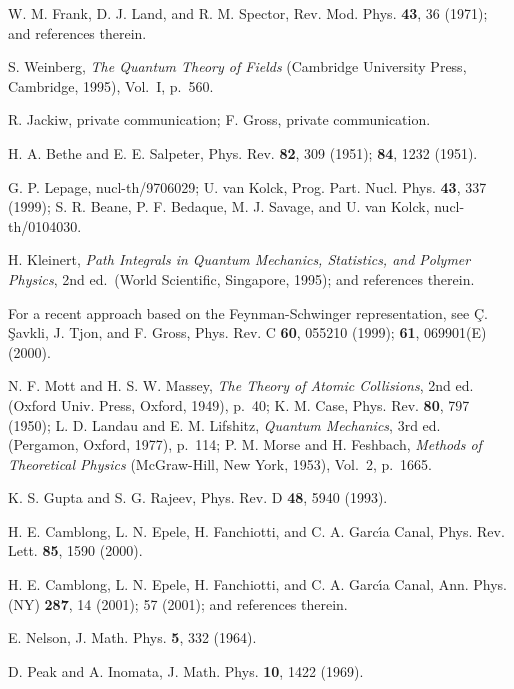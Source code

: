 \documentclass[a4paper,preprint,draft,showpacs,amsmath,amsfonts,amssymb,aps,prd]{revtex4}%
\begin{document}
\begin{thebibliography}{99}

W. M. Frank, D. J. Land, and R. M. Spector,
Rev. Mod. Phys. {\bf 43}, 36 (1971); and references therein.

S. Weinberg,
 {\em The Quantum Theory of Fields\/}
(Cambridge University Press, Cambridge, 1995), Vol.\ I, p.\ 560. 

R. Jackiw, private communication;
F. Gross, private communication.

H. A. Bethe and E. E. Salpeter,
Phys. Rev. {\bf 82},  309 (1951);
{\bf 84},  1232 (1951).

G. P. Lepage, nucl-th/9706029;
U. van Kolck, Prog. Part. Nucl. Phys. {\bf 43}, 337 (1999);
S. R. Beane, P. F. Bedaque, M. J. Savage, and U. van Kolck,
nucl-th/0104030.

H. Kleinert, {\em Path Integrals in Quantum Mechanics, Statistics,
and Polymer Physics\/}, 2nd ed.\  
(World Scientific, Singapore, 1995);
and references therein.

For a recent approach based
on the Feynman-Schwinger representation, see
\c{C}. \c{S}avkli, J. Tjon, and F. Gross,
Phys. Rev. C {\bf 60}, 055210 (1999); {\bf 61}, 069901(E) (2000).

N. F. Mott and H. S. W. Massey,
{\em The Theory of Atomic Collisions\/},
2nd ed. (Oxford Univ. Press, Oxford, 1949),
p.\ 40;
K. M. Case,
Phys. Rev. {\bf 80}, 797 (1950);
L. D. Landau and E. M. Lifshitz,
{\em Quantum Mechanics\/}, 3rd ed.
(Pergamon, Oxford, 1977),
p.\ 114;
P. M. Morse and H. Feshbach,
{\em Methods of Theoretical Physics\/}
(McGraw-Hill, New York, 1953),
 Vol.\ 2, p.\ 1665.

K. S. Gupta and S. G. Rajeev,
Phys. Rev. D {\bf 48}, 5940 (1993). %

H. E. Camblong, L. N. Epele, H. Fanchiotti, and C. A. Garc\'{\i}a Canal, 
Phys. Rev. Lett. {\bf 85}, 1590 (2000).

H. E. Camblong, L. N. Epele, H. Fanchiotti, and C. A. Garc\'{\i}a
Canal,
Ann. Phys. (NY) {\bf 287}, 14 (2001);  57 (2001);
and references therein.

E. Nelson,
J. Math. Phys. {\bf 5}, 332 (1964).  

D. Peak and A. Inomata, 
J. Math. Phys. {\bf 10}, 1422 (1969).  


\end{thebibliography}
\end{document}
